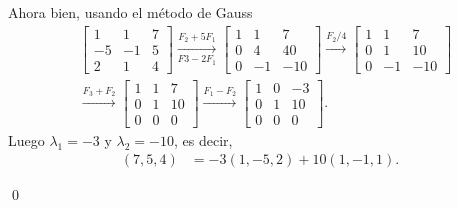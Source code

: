 \documentclass{beamer} %
\begin{document}
    \begin{frame}
    Ahora bien, usando el método de Gauss
    \begin{align*}
        &\left[\begin{array}{rr|r}
        1 & 1 & 7 \\ -5 & -1 & 5 \\	2 & 1 & 4
        \end{array}\right] 
        \underset{F3-2F_1}{\stackrel{F_2+5F_1}{\longrightarrow}} 
        \left[\begin{array}{rr|r}
        1 & 1 & 7 \\ 0 & 4 & 40 \\	0 & -1 & -10
        \end{array}\right]\stackrel{F_2/4}{\longrightarrow}
        \left[\begin{array}{rr|r}
        1 & 1 & 7 \\ 0 & 1 & 10 \\	0 & -1 & -10
        \end{array}\right] \\
        &\stackrel{F_3+F_2}{\longrightarrow}
        \left[\begin{array}{rr|r}
        1 & 1 & 7 \\ 0 & 1 & 10 \\	0 & 0 & 0
        \end{array}\right] \stackrel{F_1-F_2}{\longrightarrow}
        \left[\begin{array}{rr|r}
        1 & 0 & -3 \\ 0 & 1 & 10 \\	0 & 0 & 0
        \end{array}\right].
    \end{align*}	
        Luego $\lambda_1= -3$ y $\lambda_2 = -10$,  es decir,
        \begin{align*}
        (7, 5, 4) &= -3(1,-5,2)+10 (1,-1,1).
        \end{align*} 

        \qed


\end{frame}
    
\end{document}
